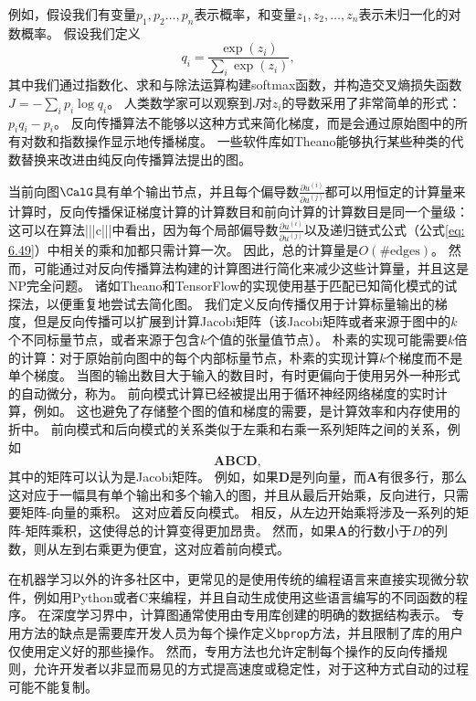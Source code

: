 例如，假设我们有变量$p_1,p_2\ldots,p_n$表示概率，和变量$z_1,z_2,\ldots,z_n$表示未归一化的对数概率。
假设我们定义
\begin{equation}
  q_i = \frac{\exp(z_i)}{\sum_i \exp(z_i)},
\end{equation}
其中我们通过指数化、求和与除法运算构建softmax函数，并构造交叉熵损失函数$J=-\sum_i p_i\log q_i$。
人类数学家可以观察到$J$对$z_i$的导数采用了非常简单的形式：$p_iq_i-p_i$。
反向传播算法不能够以这种方式来简化梯度，而是会通过原始图中的所有对数和指数操作显示地传播梯度。
一些软件库如Theano\citep{bergstra+al:2010-scipy-small,Bastien-Theano-2012}能够执行某些种类的代数替换来改进由纯反向传播算法提出的图。
  
  
当前向图$\CalG$具有单个输出节点，并且每个偏导数$\frac{\partial u^{(i)}}{\partial u^{(j)}}$都可以用恒定的计算量来计算时，反向传播保证梯度计算的计算数目和前向计算的计算数目是同一个量级：这可以在算法|||c|||中看出，因为每个局部偏导数$\frac{\partial u^{(i)}}{\partial u^{(j)}}$以及递归链式公式（公式\ref{eq: 6.49}）中相关的乘和加都只需计算一次。
因此，总的计算量是$O(\#\text{edges})$。
然而，可能通过对反向传播算法构建的计算图进行简化来减少这些计算量，并且这是NP完全问题。
诸如Theano和TensorFlow的实现使用基于匹配已知简化模式的试探法，以便重复地尝试去简化图。
我们定义反向传播仅用于计算标量输出的梯度，但是反向传播可以扩展到计算Jacobi矩阵（该Jacobi矩阵或者来源于图中的$k$个不同标量节点，或者来源于包含$k$个值的张量值节点）。
朴素的实现可能需要$k$倍的计算：对于原始前向图中的每个内部标量节点，朴素的实现计算$k$个梯度而不是单个梯度。
当图的输出数目大于输入的数目时，有时更偏向于使用另外一种形式的自动微分，称为。
前向模式计算已经被提出用于循环神经网络梯度的实时计算，例如\citep{Williams89b}。
这也避免了存储整个图的值和梯度的需要，是计算效率和内存使用的折中。
前向模式和后向模式的关系类似于左乘和右乘一系列矩阵之间的关系，例如
\begin{equation}
  \bm{ABCD},
\end{equation}
其中的矩阵可以认为是Jacobi矩阵。
例如，如果$\bm{D}$是列向量，而$\bm{A}$有很多行，那么这对应于一幅具有单个输出和多个输入的图，并且从最后开始乘，反向进行，只需要矩阵-向量的乘积。
这对应着反向模式。
相反，从左边开始乘将涉及一系列的矩阵-矩阵乘积，这使得总的计算变得更加昂贵。
然而，如果$\bm{A}$的行数小于$D$的列数，则从左到右乘更为便宜，这对应着前向模式。

在机器学习以外的许多社区中，更常见的是使用传统的编程语言来直接实现微分软件，例如用Python或者C来编程，并且自动生成使用这些语言编写的不同函数的程序。
在深度学习界中，计算图通常使用由专用库创建的明确的数据结构表示。
专用方法的缺点是需要库开发人员为每个操作定义\verb|bprop|方法，并且限制了库的用户仅使用定义好的那些操作。
然而，专用方法也允许定制每个操作的反向传播规则，允许开发者以非显而易见的方式提高速度或稳定性，对于这种方式自动的过程可能不能复制。

